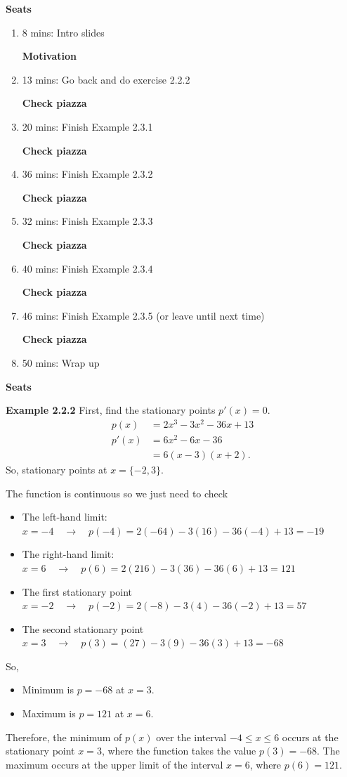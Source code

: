 \textbf{Seats}
\begin{enumerate}
    \item 8 mins: Intro slides \par
    \textbf{Motivation}
    \item 13 mins: Go back and do exercise 2.2.2 \par
    \textbf{Check piazza}
    \item 20 mins: Finish Example 2.3.1 \par
    \textbf{Check piazza}
    \item 36 mins: Finish Example 2.3.2 \par
    \textbf{Check piazza}
    \item 32 mins: Finish Example 2.3.3 \par
    \textbf{Check piazza}
    \item 40 mins: Finish Example 2.3.4 \par
    \textbf{Check piazza}
    \item 46 mins: Finish Example 2.3.5 (or leave until next time) \par
    \textbf{Check piazza}
    \item 50 mins: Wrap up \par
\end{enumerate}
\textbf{Seats}

\vspace{10mm}
\textbf{Example 2.2.2}
First, find the stationary points $p'(x) = 0$.
\begin{align*}
    p(x) &= 2x^3-3x^2-36x+13\\
    p'(x) &= 6x^2-6x-36\\
    &= 6(x-3)(x+2).
\end{align*}
So, stationary points at $x = \{-2,3\}$.

The function is continuous so we just need to check
\begin{itemize}
    \item The left-hand limit: $x=-4 \quad \rightarrow \quad p(-4) = 2(-64) - 3(16) - 36(-4) + 13 = -19$
    \item The right-hand limit: $x=6 \quad \rightarrow \quad p(6) = 2(216)-3(36)-36(6)+13 = 121$
    \item The first stationary point $x=-2 \quad \rightarrow \quad p(-2) = 2(-8) - 3(4) - 36(-2) + 13 = 57$
    \item The second stationary point $x=3 \quad \rightarrow \quad p(3) = (27)-3(9)-36(3)+13=-68$
\end{itemize}
So, 
\begin{itemize}
    \item Minimum is $p=-68$ at $x=3$.
    \item Maximum is $p = 121$ at $x=6$.
\end{itemize}
Therefore, the minimum of $p(x)$ over the interval $-4 \leq x \leq 6$ occurs at the stationary point $x=3$, where the function takes the value $p(3) = -68$. The maximum occurs at the upper limit of the interval $x=6$, where $p(6) = 121$.

